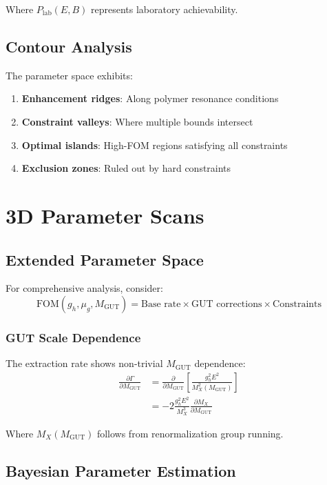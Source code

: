 \documentclass[11pt]{article}
\begin{document}
Where $P_{\text{lab}}(E,B)$ represents laboratory achievability.

\subsection{Contour Analysis}

The parameter space exhibits:
\begin{enumerate}
    \item \textbf{Enhancement ridges}: Along polymer resonance conditions
    \item \textbf{Constraint valleys}: Where multiple bounds intersect
    \item \textbf{Optimal islands}: High-FOM regions satisfying all constraints
    \item \textbf{Exclusion zones}: Ruled out by hard constraints
\end{enumerate}

\section{3D Parameter Scans}

\subsection{Extended Parameter Space}

For comprehensive analysis, consider:
\begin{equation}
\text{FOM}(g_h, \mu_g, M_{\text{GUT}}) = \text{Base rate} \times \text{GUT corrections} \times \text{Constraints}
\end{equation}

\subsubsection{GUT Scale Dependence}

The extraction rate shows non-trivial $M_{\text{GUT}}$ dependence:
\begin{align}
\frac{\partial \Gamma}{\partial M_{\text{GUT}}} &= \frac{\partial}{\partial M_{\text{GUT}}}\left[\frac{g_h^2 E^2}{M_X^2(M_{\text{GUT}})}\right] \\
&= -2\frac{g_h^2 E^2}{M_X^3} \frac{\partial M_X}{\partial M_{\text{GUT}}}
\end{align}

Where $M_X(M_{\text{GUT}})$ follows from renormalization group running.

\subsection{Bayesian Parameter Estimation}
\end{document}
